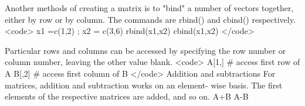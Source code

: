 Another methods of creating a matrix is to "bind" a number of vectors together, either by row or by column. The commands are rbind() and cbind() respectively.
<code>
x1 =c(1,2) ; x2 = c(3,6)
rbind(x1,x2)
cbind(x1,x2)
</code>




Particular rows and columns can be accessed by specifying the row number or column number, leaving the other value blank.
<code>
A[1,]	  # access first row of A
B[,2]   # access first column of B
</code>
Addition and subtractions
For matrices, addition and subtraction works on an element- wise basis. The first elements of the respective matrices are added, and so on.
A+B
A-B
